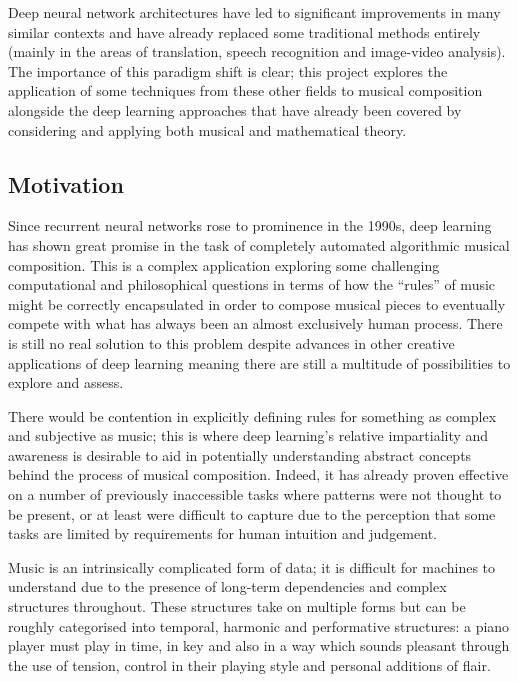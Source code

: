 \documentclass[12pt,]{article}
\begin{document}
Deep neural network architectures have led to significant improvements
in many similar contexts and have already replaced some traditional
methods entirely (mainly in the areas of translation, speech recognition
and image-video analysis). The importance of this paradigm shift is
clear; this project explores the application of some techniques from
these other fields to musical composition alongside the deep learning
approaches that have already been covered by considering and applying
both musical and mathematical theory.

\hypertarget{motivation}{%
\subsection{Motivation}\label{motivation}}

Since recurrent neural networks rose to prominence in the 1990s, deep
learning has shown great promise in the task of completely automated
algorithmic musical composition. This is a complex application exploring
some challenging computational and philosophical questions in terms of
how the ``rules'' of music might be correctly encapsulated in order to
compose musical pieces to eventually compete with what has always been
an almost exclusively human process. There is still no real solution to
this problem despite advances in other creative applications of deep
learning meaning there are still a multitude of possibilities to explore
and assess.

There would be contention in explicitly defining rules for something as
complex and subjective as music; this is where deep learning's relative
impartiality and awareness is desirable to aid in potentially
understanding abstract concepts behind the process of musical
composition. Indeed, it has already proven effective on a number of
previously inaccessible tasks where patterns were not thought to be
present, or at least were difficult to capture due to the perception
that some tasks are limited by requirements for human intuition and
judgement.

Music is an intrinsically complicated form of data; it is difficult for
machines to understand due to the presence of long-term dependencies and
complex structures throughout. These structures take on multiple forms
but can be roughly categorised into temporal, harmonic and performative
structures: a piano player must play in time, in key and also in a way
which sounds pleasant through the use of tension, control in their
playing style and personal additions of flair.
\end{document}
